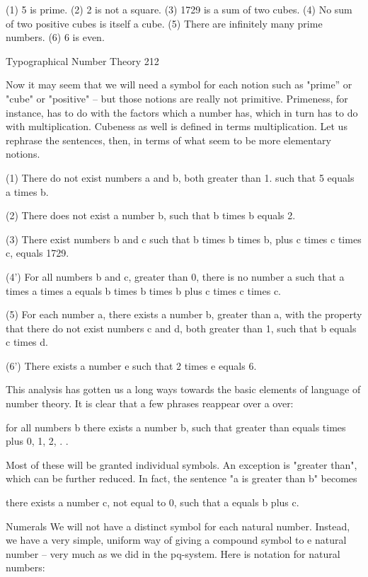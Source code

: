 (1)    5 is prime.
(2)    2 is not a square.
(3)    1729 is a sum of two cubes.
(4)    No sum of two positive cubes is itself a cube.
(5)    There are infinitely many prime numbers.
(6)    6 is even.




Typographical Number Theory                                                             212

Now it may seem that we will need a symbol for each notion such as "prime” or "cube"
or "positive" -- but those notions are really not primitive. Primeness, for instance, has to
do with the factors which a number has, which in turn has to do with multiplication.
Cubeness as well is defined in terms multiplication. Let us rephrase the sentences, then,
in terms of what seem to be more elementary notions.

   (1) There do not exist numbers a and b, both greater than 1. such that 5 equals a
       times b.

   (2) There does not exist a number b, such that b times b equals 2.

   (3) There exist numbers b and c such that b times b times b, plus c times c times c,
       equals 1729.

   (4') For all numbers b and c, greater than 0, there is no number a such that a times a
        times a equals b times b times b plus c times c times c.

   (5) For each number a, there exists a number b, greater than a, with the property
       that there do not exist numbers c and d, both greater than 1, such that b equals c
       times d.

   (6') There exists a number e such that 2 times e equals 6.

This analysis has gotten us a long ways towards the basic elements of language of
number theory. It is clear that a few phrases reappear over a over:

            for all numbers b
            there exists a number b, such that
            greater than
            equals
            times
            plus
            0, 1, 2, . .

Most of these will be granted individual symbols. An exception is "greater than", which
can be further reduced. In fact, the sentence "a is greater than b" becomes

       there exists a number c, not equal to 0, such that a equals b plus c.

                                       Numerals
We will not have a distinct symbol for each natural number. Instead, we have a very
simple, uniform way of giving a compound symbol to e natural number -- very much as
we did in the pq-system. Here is notation for natural numbers:




